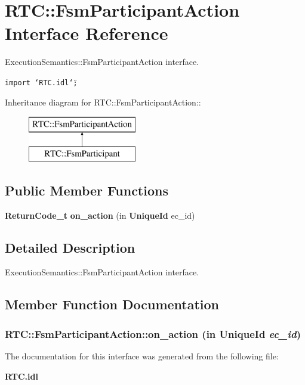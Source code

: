 \section{RTC::Fsm\-Participant\-Action Interface Reference}
\label{interfaceRTC_1_1FsmParticipantAction}
Execution\-Semantics::Fsm\-Participant\-Action interface.  


{\tt import \char`\"{}RTC.idl\char`\"{};}

Inheritance diagram for RTC::Fsm\-Participant\-Action::\begin{figure}[H]
\begin{center}
\leavevmode
\includegraphics[height=2cm]{interfaceRTC_1_1FsmParticipantAction}
\end{center}
\end{figure}
\subsection*{Public Member Functions}
\begin{CompactItemize}
\item 
{\bf Return\-Code\_\-t} {\bf on\_\-action} (in {\bf Unique\-Id} ec\_\-id)
\end{CompactItemize}


\subsection{Detailed Description}
Execution\-Semantics::Fsm\-Participant\-Action interface. 



\subsection{Member Function Documentation}
\subsubsection{ RTC::Fsm\-Participant\-Action::on\_\-action (in {\bf Unique\-Id} {\em ec\_\-id})}\label{interfaceRTC_1_1FsmParticipantAction_RTC_1_1FsmParticipantActiona0}




The documentation for this interface was generated from the following file:\begin{CompactItemize}
\item 
{\bf RTC.idl}\end{CompactItemize}
